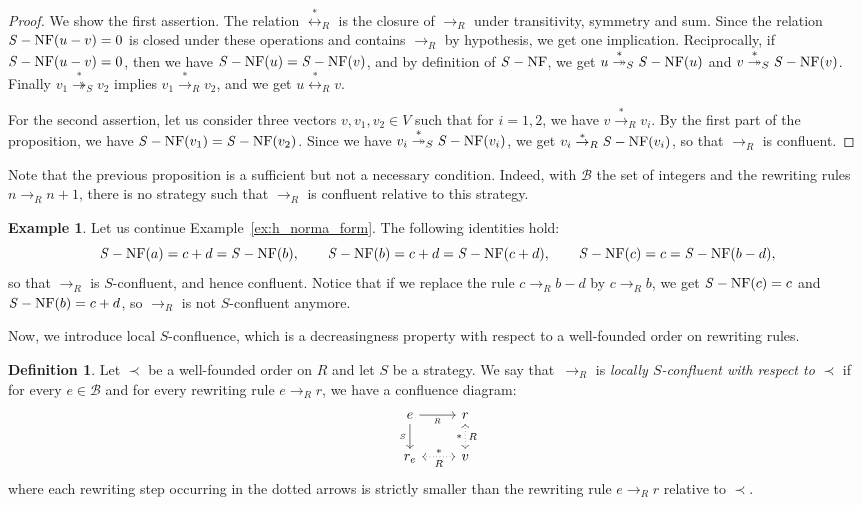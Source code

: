 \documentclass[10pt]{easychair}
\theoremstyle{definition}
\newtheorem{definition}[theorem]{Definition}
\newtheorem{example}[theorem]{Example}
\newcommand\basis{\mathscr{B}}
\newcommand\rewR{\to_R}
\newcommand\transR{\overset{*}{\to}_R}
\newcommand\transS{\overset{*}{\twoheadrightarrow}_S}
\newcommand\equivR{\overset{*}{\leftrightarrow}_R}
\DeclareMathOperator{\NF}{{\it S}-NF}
\begin{document}
\begin{proof}
  We show the first assertion. The relation $\equivR$ is the closure of
  $\rewR$ under transitivity, symmetry and sum. Since the relation
  $\NF(u-v)=0$ is closed under these operations and contains $\rewR$ by
  hypothesis, we get one implication. Reciprocally, if $\NF(u-v)=0$, then
  we have $\NF(u)=\NF(v)$, and by definition of $\NF$, we get
  $u\transS\NF(u)$ and $v\transS\NF(v)$. Finally $v_1\transS v_2$ implies
  $v_1\transR v_2$, and we get $u\equivR v$.

  For the second assertion, let us consider three vectors
  $v,v_1,v_2\in V$ such that for $i=1,2$, we have $v\transR v_i$. By the first
  part of the proposition, we have $\NF(v_1)=\NF(v_2)$. Since we have
  $v_i\transS\NF(v_i)$, we get $v_i\transR\NF(v_i)$, so that $\rewR$ is
  confluent.
\end{proof}
\smallskip

Note that the previous proposition is a sufficient but not a necessary
condition. Indeed, with $\basis$ the set of integers and the rewriting
rules $n\rewR n+1$, there is no strategy such that $\rewR$ is confluent
relative to this strategy.
\smallskip

\begin{example}
  Let us continue Example~\ref{ex:h_norma_form}. The following identities
  hold:
  \[\NF(a)=c+d=\NF(b),\qquad\NF(b)=c+d=\NF(c+d),\qquad\NF(c)=c=\NF(b-d),
  \]
  so that $\rewR$ is $S$-confluent, and hence confluent. Notice that if
  we replace the rule $c\rewR b-d$ by $c\rewR b$, we get $\NF(c)=c$ and
  $\NF(b)=c+d$, so $\rewR$ is not $S$-confluent anymore. 
\end{example}
\smallskip

Now, we introduce local $S$-confluence, which is a decreasingness
property with respect to a well-founded order on rewriting rules.
\smallskip

\begin{definition}\label{def:decreasingness_property}
  Let $\prec$ be a well-founded order on $R$ and let $S$ be a strategy.
  We say that~$\rewR$ is \emph{locally $S$-confluent with respect to}
  $\prec$ if for every $e\in\basis$ and for every rewriting rule
  $e\rewR r$, we have a confluence diagram:
  \[\begin{tikzcd}
  e\ar[r, "_R"']\ar[d, "_S"'] & r\ar[d, leftrightarrow, dotted, "*"', "R"]\\
  r_e\ar[r, leftrightarrow, dotted, "*", "R"'] & v
  \end{tikzcd}\]
  where each rewriting step occurring in the dotted arrows is strictly smaller
  than the rewriting rule $e\rewR r$ relative to $\prec$.
\end{definition}
\smallskip
\end{document}
